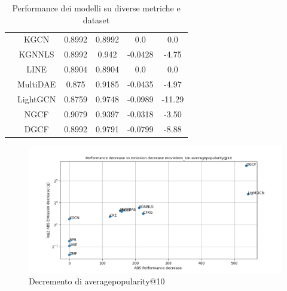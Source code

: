\begin{table}[H]
{\begin{tabular}{|c|c|c|c|c|c|}
                                           & KGCN     & 0.8992                  & 0.8992                    & 0.0               & 0.0               \\ \cline{2-6}
                                           & KGNNLS   & 0.8992                  & 0.942                     & -0.0428           & -4.75           \\ \cline{2-6}
                                           & LINE     & 0.8904                  & 0.8904                    & 0.0               & 0.0               \\ \cline{2-6}
                                           & MultiDAE & 0.875                   & 0.9185                    & -0.0435           & -4.97           \\ \cline{2-6}
                                           & LightGCN & 0.8759                  & 0.9748                    & -0.0989           & -11.29          \\ \cline{2-6}
                                           & NGCF     & 0.9079                  & 0.9397                    & -0.0318           & -3.50           \\ \cline{2-6}
                                           & DGCF     & 0.8992                  & 0.9791                    & -0.0799           & -8.88           \\ \hline
        \end{tabular}
    }
    \caption{Performance dei modelli su diverse metriche e dataset }
\end{table}



\begin{figure}[H]
    \centering
     \includegraphics[width=\textwidth]{images/decrement_averagepopularity@10_movielens_1m_40_7.png}
    \caption{Decremento di averagepopularity@10}
\end{figure}

